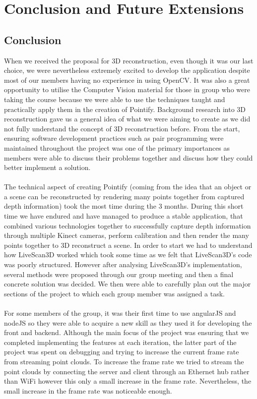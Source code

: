 \documentclass{article}
\begin{document}
\section{Conclusion and Future Extensions}
\subsection{Conclusion}

When we received the proposal for 3D reconstruction, even though it was our last choice, we were nevertheless extremely excited to develop the application despite most of our members having no experience in using OpenCV. It was also a great opportunity to utilise the Computer Vision material for those in group who were taking the course because we were able to use the techniques taught and practically apply them in the creation of Pointify. Background research into 3D reconstruction gave us a general idea of what we were aiming to create as we did not fully understand the concept of 3D reconstruction before. From the start, ensuring software development practices such as pair programming were maintained throughout the project was one of the primary importances as members were able to discuss their problems together and discuss how they could better implement a solution.
\\\\
The technical aspect of creating Pointify (coming from the idea that an object or a scene can be reconstructed by rendering many points together from captured depth information) took the most time during the 3 months. During this short time we have endured and have managed to produce a stable application, that combined various technologies together to successfully capture depth information through multiple Kinect cameras, perform calibration and then render the many points together to 3D reconstruct a scene. In order to start we had to understand how LiveScan3D worked which took some time as we felt that LiveScan3D's code was poorly structured. However after analysing LiveScan3D's implementation, several methods were proposed through our group meeting and then a final concrete solution was decided. We then were able to carefully plan out the major sections of the project to which each group member was assigned a task.
\\\\
For some members of the group, it was their first time to use angularJS and nodeJS so they were able to acquire a new skill as they used it for developing the front and backend. Although the main focus of the project was ensuring that we completed implementing the features at each iteration, the latter part of the project was spent on debugging and trying to increase the current frame rate from streaming point clouds. To increase the frame rate we tried to stream the point clouds by connecting the server and client through an Ethernet hub rather than WiFi however this only a small increase in the frame rate. Nevertheless, the small increase in the frame rate was noticeable enough. 
\end{document}
